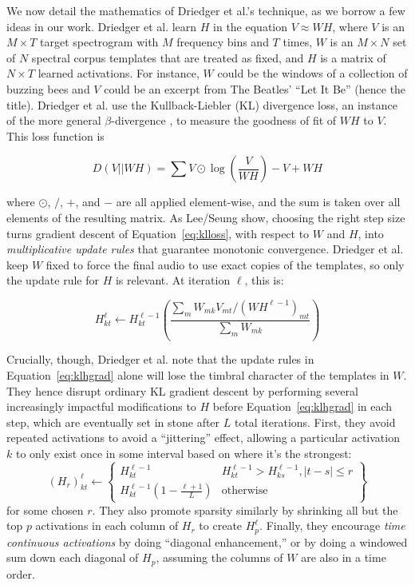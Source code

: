 \documentclass{article}
\begin{document}
We now detail the mathematics of Driedger et al.'s technique, as we borrow a few ideas in our work.  Driedger et al. learn $H$ in the equation $V \approx WH$, where $V$ is an $M \times T$ target spectrogram with $M$ frequency bins and $T$ times, $W$ is an $M \times N$ set of $N$ spectral corpus templates that are treated as fixed, and $H$ is a matrix of $N \times T$ learned activations.  For instance, $W$ could be the windows of a collection of buzzing bees and $V$ could be an excerpt from The Beatles' ``Let It Be'' (hence the title).  Driedger et al. use the Kullback-Liebler (KL) divergence loss, an instance of the more general $\beta$-divergence \cite{buch2017nichtnegativematrixfaktorisierungnutzendesklangsynthesensystem}, to measure the goodness of fit of $WH$ to $V$.  This loss function is 

\begin{equation}
\label{eq:klloss}
D(V || WH) = \sum V \odot \log \left( \frac{V}{WH} \right) - V + WH
\end{equation}

where $\odot$, $/$, $+$, and $-$ are all applied element-wise, and the sum is taken over all elements of the resulting matrix.  As Lee/Seung show, choosing the right step size turns gradient descent of Equation~\ref{eq:klloss}, with respect to $W$ and $H$, into {\em multiplicative update rules} that guarantee monotonic convergence.  Driedger et al. keep $W$ fixed to force the final audio to use exact copies of the templates, so only the update rule for $H$ is relevant.  At iteration $\ell$, this is:

\begin{equation}
\label{eq:klhgrad}
H_{kt}^{\ell} \gets H_{kt}^{\ell-1} \left( \frac{ \sum_{m} W_{mk} V_{mt} / (WH^{\ell-1})_{mt} }{ \sum_{m} W_{mk} } \right)
\end{equation}

Crucially, though, Driedger et al. note that the update rules in Equation~\ref{eq:klhgrad} alone will lose the timbral character of the templates in $W$.  They hence disrupt ordinary KL gradient descent by performing several increasingly impactful modifications to $H$ before Equation~\ref{eq:klhgrad} in each step, which are eventually set in stone after $L$ total iterations.  First, they avoid repeated activations to avoid a ``jittering'' effect, allowing a particular activation $k$ to only exist once in some interval based on where it's the strongest:
\begin{equation}
    \label{eq:driedgerrepeated}
    (H_r)_{kt}^{\ell} \gets \left\{ \begin{array}{cc} H^{\ell-1}_{kt} & H^{\ell-1}_{kt} > H^{\ell-1}_{ks}, |t - s| \leq r \\ H^{\ell-1}_{kt} (1 - \frac{\ell+1}{L}) & \text{otherwise}  \end{array} \right\}
\end{equation}
for some chosen $r$.  They also promote sparsity similarly by shrinking all but the top $p$ activations in each column of $H_r$ to create $H_p^{\ell}$.  Finally, they encourage {\em time continuous activations} by doing ``diagonal enhancement,'' or by doing a windowed sum down each diagonal of $H_p$, assuming the columns of $W$ are also in a time order.
\end{document}
